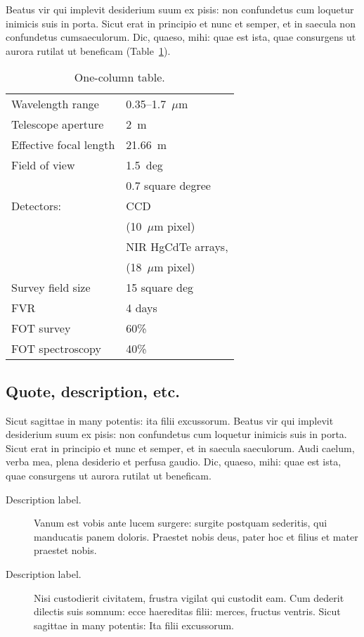 \documentclass{arkiv}
\begin{document}
Beatus vir qui implevit desiderium
suum ex pisis: non confundetus cum loquetur inimicis suis in porta.
Sicut erat in principio et nunc et semper, et in saecula non
confundetus cumsaeculorum. Dic, quaeso, mihi: quae est ista, quae
consurgens ut aurora rutilat ut beneficam (Table~\ref{t1}).


\begin{table}[t]
\caption{One-column table.}\label{t1}
\begin{tabular}{@{}ll}
\hline
Wavelength range & 0.35--1.7~$\mu\textrm{m}$ \\
Telescope aperture & 2~m \\
Effective focal length & 21.66~m \\
Field of view & 1.5~deg  \\
& 0.7 square degree \\
Detectors: & CCD \\
& (10~$\mu\textrm{m}$ pixel) \\
& NIR HgCdTe arrays, \\
& (18~$\mu\textrm{m}$ pixel) \\
Survey field size & 15 square deg \\
FVR & 4 days \\
FOT survey & 60\% \\
FOT spectroscopy & 40\% \\
\hline
\end{tabular}
\end{table}


\subsection{Quote, description, etc.}

Sicut sagittae in many potentis: ita filii excussorum. Beatus vir qui
implevit desiderium suum ex pisis: non confundetus cum loquetur inimicis
suis in porta.  Sicut erat in principio et nunc et semper, et in saecula
saeculorum. Audi caelum, verba mea, plena desiderio et perfusa gaudio.
Dic, quaeso, mihi: quae est ista, quae consurgens ut aurora rutilat ut
beneficam.


\begin{description}
\item[Description label.] Vanum est vobis ante lucem surgere: surgite postquam
sederitis, qui manducatis panem doloris. Praestet nobis deus, pater
hoc et filius et mater praestet nobis.

\item[Description label.] Nisi custodierit civitatem,
frustra vigilat qui custodit eam. Cum dederit dilectis suis somnum:
ecce haereditas filii: merces, fructus ventris. Sicut sagittae in
many potentis: Ita filii excussorum.
\end{description}
\end{document}
